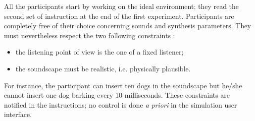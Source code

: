 \documentclass[twoside,twocolumn]{article}
\begin{document}
All the participants start by working on the ideal environment; they read the second set of instruction at the end of the first experiment. Participants are completely free of their choice concerning sounds and synthesis parameters. They must nevertheless respect the two following constraints :
\begin{itemize}
\item the listening point of view is the one of a fixed listener;
\item  the soundscape must be realistic, i.e. physically plausible.
\end{itemize}
For instance, the participant can insert ten dogs in the soundscape but he/she cannot insert one dog barking every 10 milliseconds.
These constraints are notified in the instructions; no control is done \emph{a priori} in the simulation user interface.


%
%
%
%
\end{document}
